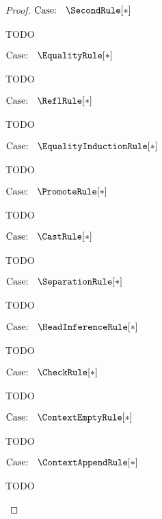 \begin{proof}
$\text{Case: }\begin{array}{c} \SecondRule[*] \end{array}$
\begin{proofcase}
    TODO
\end{proofcase}

$\text{Case: }\begin{array}{c} \EqualityRule[*] \end{array}$
\begin{proofcase}
    TODO
\end{proofcase}

$\text{Case: }\begin{array}{c} \ReflRule[*] \end{array}$
\begin{proofcase}
    TODO
\end{proofcase}

$\text{Case: }\begin{array}{c} \EqualityInductionRule[*] \end{array}$
\begin{proofcase}
    TODO
\end{proofcase}

$\text{Case: }\begin{array}{c} \PromoteRule[*] \end{array}$
\begin{proofcase}
    TODO
\end{proofcase}

$\text{Case: }\begin{array}{c} \CastRule[*] \end{array}$
\begin{proofcase}
    TODO
\end{proofcase}

$\text{Case: }\begin{array}{c} \SeparationRule[*] \end{array}$
\begin{proofcase}
    TODO
\end{proofcase}

$\text{Case: }\begin{array}{c} \HeadInferenceRule[*] \end{array}$
\begin{proofcase}
    TODO
\end{proofcase}

$\text{Case: }\begin{array}{c} \CheckRule[*] \end{array}$
\begin{proofcase}
    TODO
\end{proofcase}

$\text{Case: }\begin{array}{c} \ContextEmptyRule[*] \end{array}$
\begin{proofcase}
    TODO
\end{proofcase}

$\text{Case: }\begin{array}{c} \ContextAppendRule[*] \end{array}$
\begin{proofcase}
    TODO
\end{proofcase}
\end{proof}
